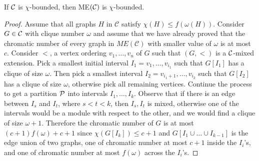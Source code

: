\documentclass[11pt]{article}
\numberwithin{equation}{section}
\begin{document}
\begin{theorem}\label{th:chimix}
If $\cal C$ is $\chi$-bounded, then ME$(\cal C)$ is $\chi$-bounded.
\end{theorem}

\begin{proof} Assume that all graphs $H$ in $\mathcal{C}$ satisfy $\chi(H)\leq f(\omega (H))$. Consider $G\in \cal C$ with clique number $\omega$ and assume that we have already proved that the chromatic number of every graph in $ME(\mathcal{C})$ with smaller value of $\omega$ is at most $c$. Consider $<$, a vertex ordering $v_1,\dots ,v_n$ of $G$ such that $(G,<)$ is a $\cal C$-mixed extension. Pick a smallest initial interval $I_1=v_1,\dots ,v_{i_1}$ such that $G[I_1]$ has a clique of size $\omega$. Then pick a smallest interval $I_2=v_{i_1+1},\dots ,v_{i_2}$ such that $G[I_2]$ has a clique of size $\omega$, otherwise pick all remaining vertices. Continue the process to get a partition $\cal P$ into intervals $I_1,\dots ,I_k$. Observe that if there is an edge between $I_s$ and $I_t$, where $s<t<k$, then $I_s,I_t$ is mixed, otherwise one of the intervals would be a module with respect to the other, and we would find a clique of size $\omega +1$. Therefore the chromatic number of $G$ is at most $(c+1)f(\omega )+c+1$ since $\chi(G[I_k])\leq c+1$ and  $G[I_1\cup \dots \cup I_{k-1}]$ is the edge union of two graphs, one of chromatic number at most $c+1$ inside the $I_i$'s, and one of chromatic number at most $f(\omega)$ across the $I_i$'s.
\end{proof}
\end{document}
